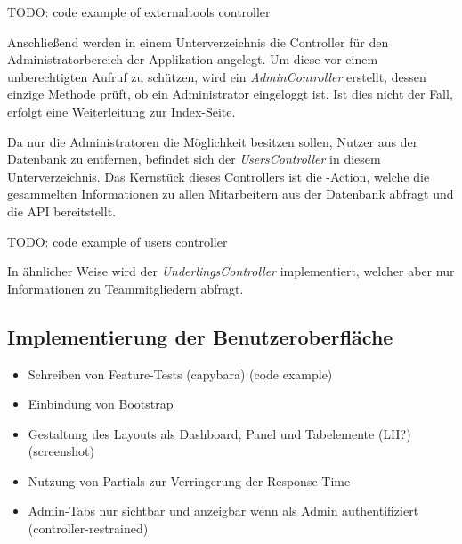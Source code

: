 TODO: code example of externaltools controller

Anschließend werden in einem Unterverzeichnis die Controller für den Administratorbereich der
Applikation angelegt. Um diese vor einem unberechtigten Aufruf zu schützen, wird ein
\textit{AdminController} erstellt, dessen einzige Methode prüft, ob ein Administrator eingeloggt ist.
Ist dies nicht der Fall, erfolgt eine Weiterleitung zur Index-Seite.

Da nur die Administratoren die Möglichkeit besitzen sollen, Nutzer aus der Datenbank zu entfernen,
befindet sich der \textit{UsersController} in diesem Unterverzeichnis. Das Kernstück dieses
Controllers ist die -Action, welche die gesammelten Informationen zu allen
Mitarbeitern aus der Datenbank abfragt und die API bereitstellt.

TODO: code example of users controller

In ähnlicher Weise wird der \textit{UnderlingsController} implementiert, welcher aber nur
Informationen zu Teammitgliedern abfragt.

\subsection{Implementierung der Benutzeroberfläche}
\label{sec:Implementierung der Benutzeroberfläche}
\begin{itemize}
	\item Schreiben von Feature-Tests (capybara) (code example)
	\item Einbindung von Bootstrap
	\item Gestaltung des Layouts als Dashboard, Panel und Tabelemente (LH?) (screenshot)
	\item Nutzung von Partials zur Verringerung der Response-Time
	\item Admin-Tabs nur sichtbar und anzeigbar wenn als Admin authentifiziert (controller-restrained)
\end{itemize}

